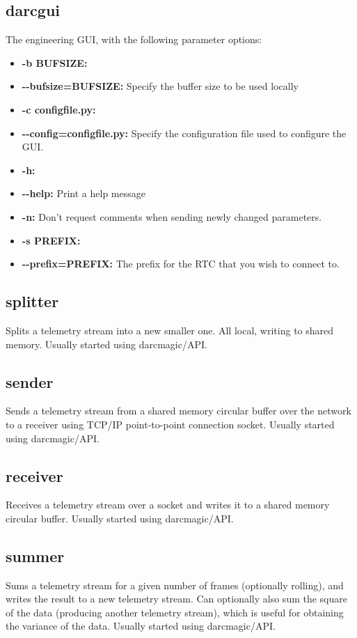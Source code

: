 \documentclass[a4,10pt]{article}
\begin{document}
\subsection{darcgui}

The engineering GUI, with the following parameter options:
\begin{itemize}
\item {\bf -b BUFSIZE:}
\item {\bf -{-}bufsize=BUFSIZE:} Specify the buffer size to be
  used locally
\item {\bf -c configfile.py:}
\item {\bf -{-}config=configfile.py:} Specify the
  configuration file used to configure the GUI.
\item {\bf -h:}
\item {\bf -{-}help:} Print a help message
\item {\bf -n:} Don't request comments when sending newly changed
  parameters.
\item {\bf -s PREFIX:}
\item {\bf -{-}prefix=PREFIX:} The prefix for the RTC that you
  wish to connect to.
\end{itemize}

\subsection{splitter}
Splits a telemetry stream into a new smaller one.  All local, writing
to shared memory.  Usually started using darcmagic/API.

\subsection{sender}
Sends a telemetry stream from a shared memory circular buffer over the
network to a receiver using TCP/IP point-to-point connection socket.
Usually started using darcmagic/API.
\subsection{receiver}
Receives a telemetry stream over a socket and writes it to a shared
memory circular buffer.  Usually started using darcmagic/API.

\subsection{summer}
Sums a telemetry stream for a given number of frames (optionally
rolling), and writes the result to a new telemetry stream.  Can
optionally also sum the square of the data (producing another
telemetry stream), which is useful for obtaining the variance of the data.
Usually started using darcmagic/API.
\end{document}
